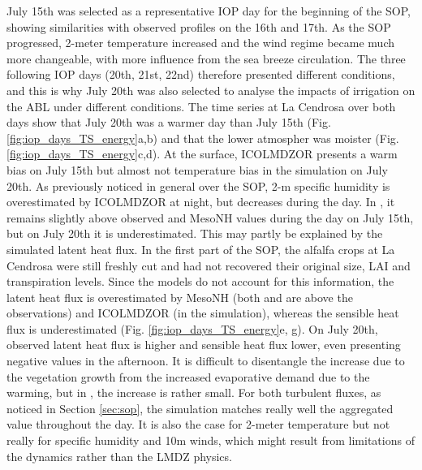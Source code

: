 July 15th was selected as a representative IOP day for the beginning of the SOP, showing similarities with observed profiles on the 16th and 17th. As the SOP progressed, 2-meter temperature increased and the wind regime became much more changeable, with more influence from the sea breeze circulation.
The three following IOP days (20th, 21st, 22nd) therefore presented different conditions, and this is why July 20th was also selected to analyse the impacts of irrigation on the ABL under different conditions.
The time series at La Cendrosa over both days show that July 20th was a warmer day than July 15th (Fig. \ref{fig:iop_days_TS_energy}a,b) and that the lower atmospher was moister (Fig. \ref{fig:iop_days_TS_energy}c,d).
At the surface, ICOLMDZOR presents a warm bias on July 15th but almost not temperature bias in the \irrboost simulation on July 20th. As previously noticed in general over the SOP, 2-m specific humidity is overestimated by ICOLMDZOR at night, but decreases during the day. In \irrboost, it remains slightly above observed and MesoNH values during the day on July 15th, but on July 20th it is underestimated.
This may partly be explained by the simulated latent heat flux.%
In the first part of the SOP, the alfalfa crops at La Cendrosa were still freshly cut and had not recovered their original size, LAI and transpiration levels. %
Since the models do not account for this information, the latent heat flux is overestimated by MesoNH (both \mesoexact and \mesomean are above the observations) and ICOLMDZOR (in the \irrboost simulation), whereas the sensible heat flux is underestimated (Fig. \ref{fig:iop_days_TS_energy}e, g). 
On July 20th, observed latent heat flux is higher and sensible heat flux lower, even presenting negative values in the afternoon.
It is difficult to disentangle the increase due to the vegetation growth from the increased evaporative demand due to the warming, but in \mesoexact, the increase is rather small.%
For both turbulent fluxes, as noticed in Section \ref{sec:sop}, the \irrboost simulation matches really well the \mesomean aggregated value throughout the day. It is also the case for 2-meter temperature but not really for specific humidity and 10m winds, which might result from limitations of the dynamics rather than the LMDZ physics.



